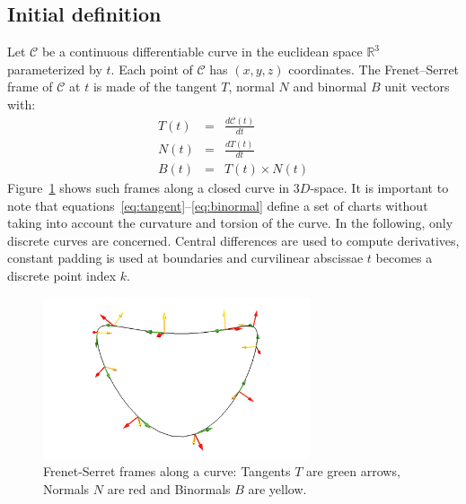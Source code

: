 \documentclass{InsightArticle}
\begin{document}
\subsection{Initial definition}
%
Let $\mathcal{C}$ be a continuous differentiable curve in the euclidean space
$\mathbb{R}^3$ parameterized by $t$. Each point of $\mathcal{C}$ has $(x,y,z)$
coordinates. The Frenet--Serret frame of $\mathcal{C}$ at $t$ is made of the 
tangent $T$, normal $N$ and binormal $B$ unit vectors with:
\begin{eqnarray}
T(t) &=& \frac{d\mathcal{C}(t)}{dt}\label{eq:tangent}\\
N(t) &=& \frac{dT(t)}{dt}\label{eq:normal}\\
B(t) &=& T(t)\times N(t)\label{eq:binormal}
\end{eqnarray}
%
Figure~\ref{fig:frenet-serret_frames} shows such frames along a closed curve
in $3D$-space. It is important to note that
equations~\eqref{eq:tangent}--\eqref{eq:binormal}
define a set of charts without taking into account the curvature and torsion of
the curve. In the following, only discrete curves are concerned. Central
differences are used to compute derivatives, constant padding is used at
boundaries and curvilinear abscissae $t$ becomes a discrete point index $k$.
%
\begin{figure}
\centering
\includegraphics[width=0.7\textwidth]{Images/frenet-serret_frames}
\caption{Frenet-Serret frames along a curve: Tangents $T$ are green arrows,
Normals $N$ are red and Binormals $B$ are yellow.}
\label{fig:frenet-serret_frames}
\end{figure}
%
\end{document}
